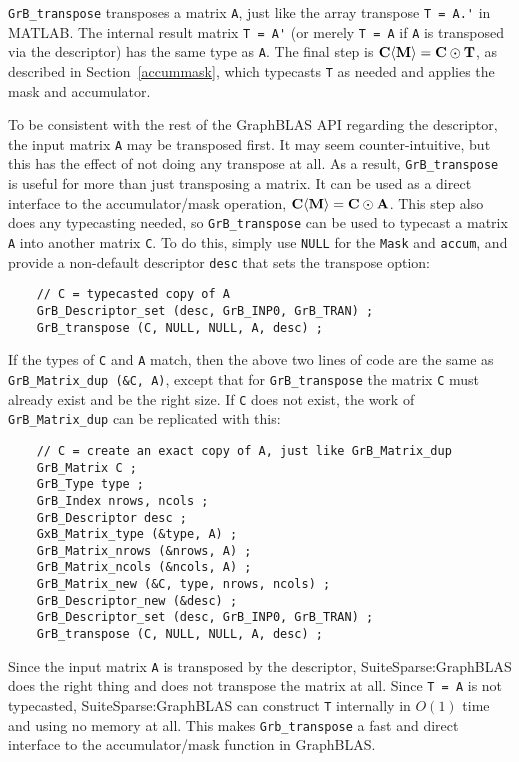 \documentclass[12pt]{article}
\begin{document}
\verb'GrB_transpose'
transposes a matrix \verb'A', just like the array transpose \verb"T = A.'" in
MATLAB.  The internal result matrix \verb"T = A'" (or merely \verb"T = A" if
\verb'A' is transposed via the descriptor) has the same type as \verb'A'.  The
final step is ${\bf C \langle M \rangle  = C \odot T}$, as described in
Section~\ref{accummask}, which typecasts \verb'T' as needed and applies the
mask and accumulator.

To be consistent with the rest of the GraphBLAS API regarding the
descriptor, the input matrix \verb'A' may be transposed first.  It may seem
counter-intuitive, but this has the effect of not doing any transpose at all.
As a result, \verb'GrB_transpose' is useful for more than just transposing a
matrix.  It can be used as a direct interface to the accumulator/mask
operation, ${\bf C \langle M \rangle  = C \odot A}$.  This step also does any
typecasting needed, so \verb'GrB_transpose' can be used to typecast a matrix
\verb'A' into another matrix \verb'C'.  To do this, simply use \verb'NULL' for
the \verb'Mask' and \verb'accum', and provide a non-default descriptor
\verb'desc' that sets the transpose option:

    {\footnotesize
    \begin{verbatim}
    // C = typecasted copy of A
    GrB_Descriptor_set (desc, GrB_INP0, GrB_TRAN) ;
    GrB_transpose (C, NULL, NULL, A, desc) ; \end{verbatim}}

If the types of \verb'C' and \verb'A' match,
then the above two lines of code are the
same as \verb'GrB_Matrix_dup (&C, A)', except that for \verb'GrB_transpose' the
matrix \verb'C' must already exist and be the right size.  If \verb'C' does not
exist, the work of \verb'GrB_Matrix_dup' can be replicated with this:

    {\footnotesize
    \begin{verbatim}
    // C = create an exact copy of A, just like GrB_Matrix_dup
    GrB_Matrix C ;
    GrB_Type type ;
    GrB_Index nrows, ncols ;
    GrB_Descriptor desc ;
    GxB_Matrix_type (&type, A) ;
    GrB_Matrix_nrows (&nrows, A) ;
    GrB_Matrix_ncols (&ncols, A) ;
    GrB_Matrix_new (&C, type, nrows, ncols) ;
    GrB_Descriptor_new (&desc) ;
    GrB_Descriptor_set (desc, GrB_INP0, GrB_TRAN) ;
    GrB_transpose (C, NULL, NULL, A, desc) ; \end{verbatim}}

Since the input matrix \verb'A' is transposed by the descriptor,
SuiteSparse:Graph\-BLAS does the right thing and does not transpose the matrix
at all.  Since \verb'T = A' is not typecasted, SuiteSparse:GraphBLAS can
construct \verb'T' internally in $O(1)$ time and using no memory at all.   This
makes \verb'Grb_transpose' a fast and direct interface to the accumulator/mask
function in GraphBLAS.
\end{document}
